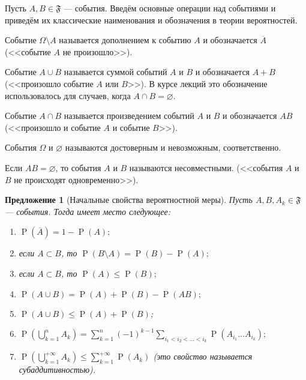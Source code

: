 \documentclass[12pt]{article}
\newtheorem{proposition}{Предложение}
\numberwithin{theorem}{section}
\numberwithin{proposition}{section}
\theoremstyle{definition}
\newcommand{\prob}{\operatorname{P}}
\newcommand{\defin}[2]{\hypertarget{#2}{{\color{red} #1}}}
\newcommand{\events}{\mathfrak{F}}
\begin{document}
	Пусть $ A, B \in \events $ --- события. Введём основные операции над событиями 
	и приведём их классические наименования и обозначения в теории вероятностей. 
	
	Событие $ \Omega \setminus A $ называется
	\defin{дополнением к событию $ A $}{event-compl}
	и обозначается $ \overline{A} $ (<<событие $ A $ не произошло>>).
	
	Событие $ A \cup B $ называется
	\defin{суммой событий $ A $ и $ B $}{event-sum}
	и обозначается $ A + B $  (<<произошло событие $ A $ или $ B $>>). 
	В курсе лекций это обозначение использовалось для случаев, когда $ A \cap B = \varnothing $.
	
	Событие $ A \cap B $ называется 
	\defin{произведением событий $ A $ и $ B $}{event-product} 
	и обозначается $ AB $ (<<произошло и событие $ A $ и событие $ B $>>).
	
	События $ \Omega $ и $ \varnothing $ называются \defin{достоверным}{} и \defin{невозможным}{}, соответственно.
	
	Если $ AB = \varnothing $, то события $ A $ и $ B $ называются \defin{несовместными}{}.
	(<<события $ A $ и $ B $ не происходят одновременно>>).
	
	\begin{proposition}[Начальные свойства вероятностной меры]
		Пусть $ A, B, A_k \in \events $ --- события.
		Тогда имеет место следующее:
		\begin{enumerate}
			\item $ \prob(\overline{A}) = 1 - \prob(A); $ \label{prob-prop1}
			\item если $ A \subset B $, то $ \prob(B \setminus A) = \prob(B) - \prob(A); $ \label{prob-prop2}
			\item если $ A \subset B $, то $ \prob(A) \leqslant \prob(B); $ \label{prob-prop2.5}
			\item $ \prob(A \cup B) = \prob(A) + \prob(B) - \prob(AB); $ \label{prob-prop3}
			\item $ \prob(A \cup B) \leqslant \prob(A) + \prob(B) $; \label{prob-prop4}
			\item $ \prob(\bigcup\limits_{k = 1}^{n} A_k) = \sum\limits_{k = 1}^{n} 
			(-1)^{k - 1}\sum\limits_{i_1 < i_2 < \ldots < i_k} \prob(A_{i_1} \ldots A_{i_k}); $ \label{prob-prop5}
			\item $ \prob\left(\bigcup\limits_{k = 1}^{+\infty} A_k \right) \leqslant \sum\limits_{k = 1}^{+\infty} \prob(A_k) $ 
			(это свойство называется \defin{субаддитивностью}{subadditivity}). \label{prob-prop6}
		\end{enumerate}
	\end{proposition}
	
\end{document}
